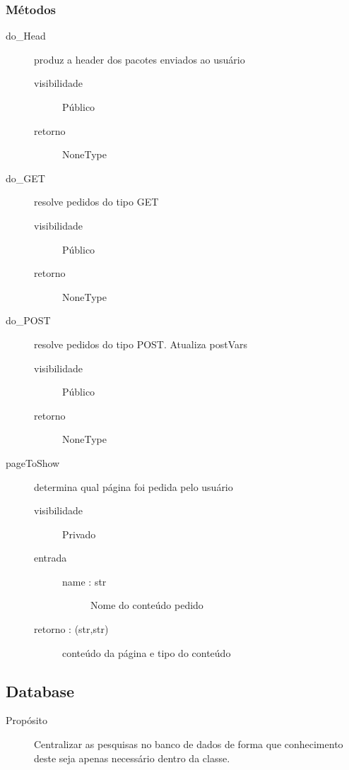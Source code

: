 \documentclass[a4paper]{article}
\begin{document}
	
	\subsubsection{Métodos}
		\begin{description}
		 \item [do\_Head] produz a header dos pacotes enviados ao usuário
			\begin{description}
			 \item [visibilidade] Público
			 \item [retorno] NoneType
			\end{description}
			
			\item [do\_GET] resolve pedidos do tipo GET
			\begin{description}
			 \item [visibilidade] Público
			 \item [retorno] NoneType
			\end{description}
			
			\item [do\_POST] resolve pedidos do tipo POST. Atualiza postVars
			\begin{description}
			 \item [visibilidade] Público
			 \item [retorno] NoneType
			\end{description}
			
			\item [pageToShow] determina qual página foi pedida pelo usuário
			\begin{description}
			 \item [visibilidade] Privado
			 \item [entrada] \mbox{}
				\begin{description}
				 \item [name : str] Nome do conteúdo pedido
				\end{description}
				
			 \item [retorno : (str,str)] conteúdo da página e tipo do conteúdo
			\end{description}
		\end{description}
		
	\subsection{Database}
	
	\begin{description}
		\item [Propósito] Centralizar as pesquisas no banco de dados de forma que conhecimento deste seja apenas necessário dentro da classe.
	\end{description}
	
\end{document}
